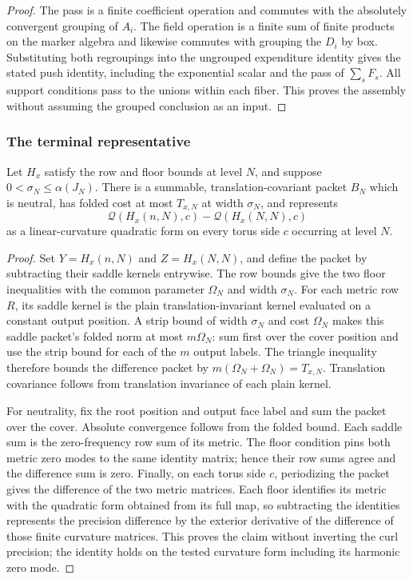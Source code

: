 \begin{proof}
The pass is a finite coefficient operation and commutes with the absolutely
convergent grouping of $A_i$. The field operation is a finite sum of finite
products on the marker algebra and likewise commutes with grouping the
$D_i$ by box. Substituting both regroupings into the ungrouped expenditure
identity gives the stated push identity, including the exponential scalar
and the pass of $\sum_sF_s$. All support conditions pass to the unions
within each fiber. This proves the assembly without assuming the grouped
conclusion as an input.
\end{proof}

\subsubsection{The terminal representative}

\begin{lemma}
\label{lem:ex-lattice-rg-terminal}
Let $H_x$ satisfy the row and floor bounds at level $N$, and suppose
$0<\sigma_N\leq\alpha(J_N)$. There is a summable, translation-covariant packet $B_N$ which is
neutral, has folded cost at most $T_{x,N}$ at width $\sigma_N$, and represents
\[
 \mathscr Q(H_x(n,N),c)-\mathscr Q(H_x(N,N),c)
\]
as a linear-curvature quadratic form on every torus side $c$ occurring at
level $N$.
\end{lemma}

\begin{proof}
Set $Y=H_x(n,N)$ and $Z=H_x(N,N)$, and define the packet by subtracting
their saddle kernels entrywise. The row bounds give the two floor
inequalities with the common parameter $\Omega_N$ and width $\sigma_N$.
For each metric row $R$, its saddle kernel is the plain translation-invariant
kernel evaluated on a constant output position. A strip bound of width
$\sigma_N$ and cost $\Omega_N$ makes this saddle packet's folded norm at
most $m\Omega_N$: sum first over the cover position and use the strip bound
for each of the $m$ output labels. The triangle inequality therefore bounds
the difference packet by $m(\Omega_N+\Omega_N)=T_{x,N}$. Translation
covariance follows from translation invariance of each plain kernel.

For neutrality, fix the root position and output face label and sum the
packet over the cover. Absolute convergence follows from the folded bound.
Each saddle sum is the zero-frequency row sum of its metric. The floor
condition pins both metric zero modes to the same identity matrix; hence
their row sums agree and the difference sum is zero. Finally, on each torus
side $c$, periodizing the packet gives the difference of the two metric
matrices. Each floor identifies its metric with the quadratic form obtained
from its full map, so subtracting the identities represents the precision
difference by the exterior derivative of the difference of those finite
curvature matrices. This proves the claim without inverting the curl
precision; the identity holds on the tested curvature form including its
harmonic zero mode.
\end{proof}

